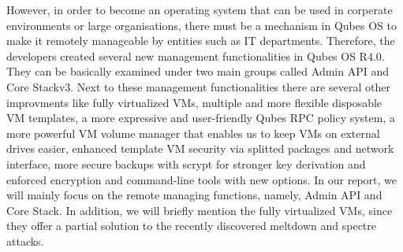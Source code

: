 \documentclass[runningheads,a4paper]{article}
\begin{document}
However, in order to become an operating system that can be used in corperate environments or large organisations, there must be a mechanism in Qubes OS to make it remotely manageable by entities such as IT departments.
Therefore, the developers created several new
management functionalities in Qubes OS R4.0. They can be basically examined under two
main groups called Admin API and Core Stackv3. Next to these management functionalities there are several other improvments like
fully virtualized VMs, multiple and more flexible disposable VM templates, a more expressive and user-friendly Qubes RPC policy system, a more powerful VM volume manager that enables us to keep VMs on external drives easier, enhanced template VM security via splitted packages and network interface, more secure backups with scrypt for stronger key derivation and enforced encryption and command-line tools with new options. In our report, we will mainly focus on the remote managing functions, namely, Admin API and Core Stack. In addition, we will briefly mention the fully virtualized VMs, since they offer a partial solution to the recently discovered meltdown and spectre attacks.
\end{document}
